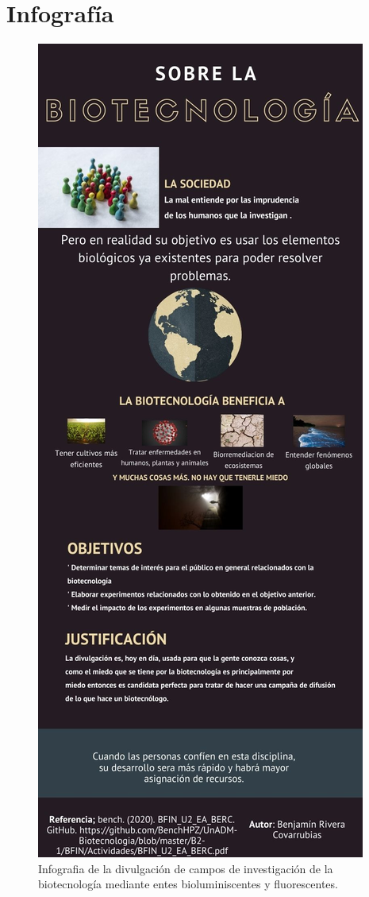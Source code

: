 \documentclass[12pt]{article}
\newcommand{\tema}[0]{divulgación de campos de investigación de la biotecnología mediante entes bioluminiscentes y fluorescentes}
\begin{document}
\section{Infografía}
\begin{figure}[h]
	\centering
		\includegraphics[height=0.7\textheight]{infografia_biotecnologia.jpg}
	\caption{Infografia de la \tema.}
	\label{fig: }
\end{figure}
\end{document}

